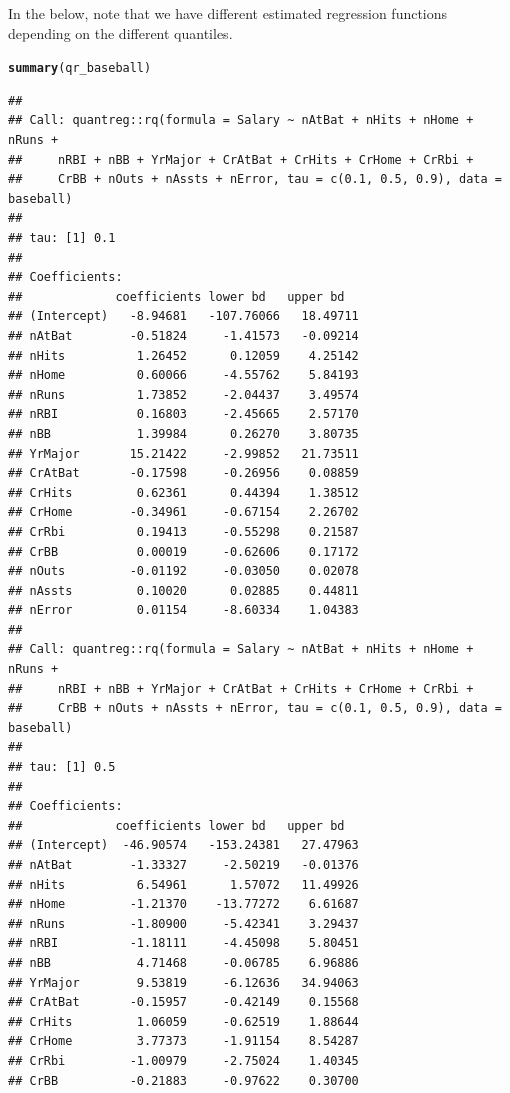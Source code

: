 \documentclass{article}\usepackage[]{graphicx}\usepackage[]{color}
\makeatletter
\newcommand{\hlstd}[1]{\textcolor[rgb]{0.345,0.345,0.345}{#1}}%
\newcommand{\hlkwd}[1]{\textcolor[rgb]{0.737,0.353,0.396}{\textbf{#1}}}%
\newenvironment{kframe}{%
 \def\at@end@of@kframe{}%
 \ifinner\ifhmode%
  \def\at@end@of@kframe{\end{minipage}}%
  \begin{minipage}{\columnwidth}%
 \fi\fi%
 \def\FrameCommand##1{\hskip\@totalleftmargin \hskip-\fboxsep
 \colorbox{shadecolor}{##1}\hskip-\fboxsep
     \hskip-\linewidth \hskip-\@totalleftmargin \hskip\columnwidth}%
 \MakeFramed {\advance\hsize-\width
   \@totalleftmargin\z@ \linewidth\hsize
   \@setminipage}}%
 {\par\unskip\endMakeFramed%
 \at@end@of@kframe}
\newenvironment{knitrout}{}{} %
\makeatother
\begin{document}
In the below, note that we have different estimated regression functions depending on the different quantiles.

\begin{knitrout}
\color{fgcolor}\begin{kframe}
\begin{alltt}
\hlkwd{summary}\hlstd{(qr_baseball)}
\end{alltt}
\begin{verbatim}
## 
## Call: quantreg::rq(formula = Salary ~ nAtBat + nHits + nHome + nRuns + 
##     nRBI + nBB + YrMajor + CrAtBat + CrHits + CrHome + CrRbi + 
##     CrBB + nOuts + nAssts + nError, tau = c(0.1, 0.5, 0.9), data = baseball)
## 
## tau: [1] 0.1
## 
## Coefficients:
##             coefficients lower bd   upper bd  
## (Intercept)   -8.94681   -107.76066   18.49711
## nAtBat        -0.51824     -1.41573   -0.09214
## nHits          1.26452      0.12059    4.25142
## nHome          0.60066     -4.55762    5.84193
## nRuns          1.73852     -2.04437    3.49574
## nRBI           0.16803     -2.45665    2.57170
## nBB            1.39984      0.26270    3.80735
## YrMajor       15.21422     -2.99852   21.73511
## CrAtBat       -0.17598     -0.26956    0.08859
## CrHits         0.62361      0.44394    1.38512
## CrHome        -0.34961     -0.67154    2.26702
## CrRbi          0.19413     -0.55298    0.21587
## CrBB           0.00019     -0.62606    0.17172
## nOuts         -0.01192     -0.03050    0.02078
## nAssts         0.10020      0.02885    0.44811
## nError         0.01154     -8.60334    1.04383
## 
## Call: quantreg::rq(formula = Salary ~ nAtBat + nHits + nHome + nRuns + 
##     nRBI + nBB + YrMajor + CrAtBat + CrHits + CrHome + CrRbi + 
##     CrBB + nOuts + nAssts + nError, tau = c(0.1, 0.5, 0.9), data = baseball)
## 
## tau: [1] 0.5
## 
## Coefficients:
##             coefficients lower bd   upper bd  
## (Intercept)  -46.90574   -153.24381   27.47963
## nAtBat        -1.33327     -2.50219   -0.01376
## nHits          6.54961      1.57072   11.49926
## nHome         -1.21370    -13.77272    6.61687
## nRuns         -1.80900     -5.42341    3.29437
## nRBI          -1.18111     -4.45098    5.80451
## nBB            4.71468     -0.06785    6.96886
## YrMajor        9.53819     -6.12636   34.94063
## CrAtBat       -0.15957     -0.42149    0.15568
## CrHits         1.06059     -0.62519    1.88644
## CrHome         3.77373     -1.91154    8.54287
## CrRbi         -1.00979     -2.75024    1.40345
## CrBB          -0.21883     -0.97622    0.30700

\end{verbatim}
\end{kframe}
\end{knitrout}
\end{document}
